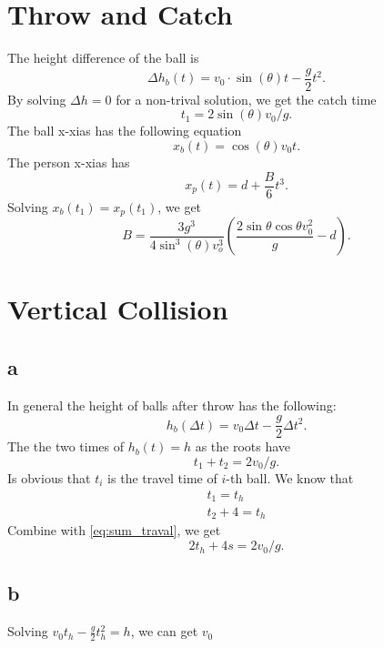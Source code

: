 \documentclass{article}
\begin{document}
\section{Throw and Catch}
The height difference of the ball is
\begin{equation}
  \Delta h_b(t) = v_0\cdot \sin(\theta)t - \frac{g}{2}t^2.
\end{equation}
By solving $\Delta h = 0$ for a non-trival solution, we get the catch time
\[t_1 = 2\sin(\theta)v_0 / g.\]
The ball x-xias has the following equation
\[x_b(t) = \cos(\theta)v_0 t.\]
The person x-xias has
\[x_p(t) = d + \frac{B}{6}t^3.\]
Solving $x_b(t_1) = x_p(t_1)$, we get
\[B = \frac{3g^3}{4\sin^3(\theta)v_o^3}\left( \frac{2\sin\theta\cos\theta v_0^2}{g} - d\right).\]

\section{Vertical Collision}
\subsection{a}
In general the height of balls after throw has the following:
\[h_b(\Delta t) = v_0 \Delta t - \frac{g}{2}\Delta t^2.\]
The the two times of $h_b(t) = h$ as the roots have
\begin{equation}\label{eq:sum_traval}
 t_ 1 + t_2 = 2v_0 / g.
\end{equation}
Is obvious that $t_i$ is the travel time of $i$-th ball. We know that
\begin{align}
  t_1 = t_h \\
  t_2  + 4 = t_h 
\end{align}
Combine with \eqref{eq:sum_traval}, we get
\[2t_h + 4\si{s} = 2v_0 / g. \]
\subsection{b}
Solving $v_0 t_h - \frac{g}{2}t_h^2 = h$, we can get $v_0$
\end{document}
